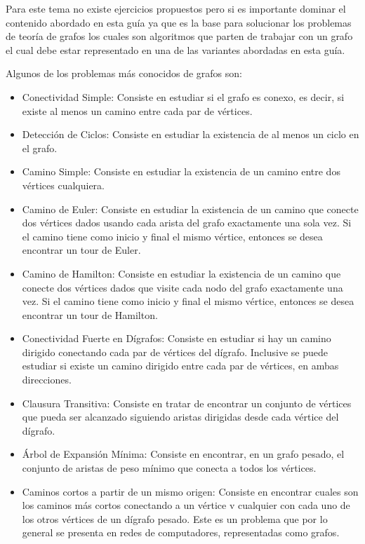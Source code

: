 Para este tema no existe ejercicios propuestos pero si es importante dominar el contenido abordado en esta guía ya que es la base para solucionar los problemas de teoría de grafos los cuales son algoritmos que parten de trabajar con un grafo el cual debe estar representado en una de las variantes abordadas en esta guía.

Algunos de los problemas más conocidos de grafos son:

\begin{itemize}
	\item Conectividad Simple: Consiste en estudiar si el grafo es conexo, es decir, si existe al menos un camino entre cada par de vértices.
	
	\item Detección de Ciclos: Consiste en estudiar la existencia de al menos un ciclo en el grafo.
	
	\item Camino Simple: Consiste en estudiar la existencia de un camino entre dos vértices cualquiera.
	
	\item Camino de Euler: Consiste en estudiar la existencia de un camino que conecte dos vértices dados usando cada arista del grafo exactamente una sola vez. Si el camino tiene como inicio y final el mismo vértice, entonces se desea encontrar un tour de Euler.
	
	\item Camino de Hamilton: Consiste en estudiar la existencia de un camino que conecte dos vértices dados que visite cada nodo del grafo exactamente una vez. Si el camino tiene como inicio y final el mismo vértice, entonces se desea encontrar un tour de Hamilton.
	
	\item Conectividad Fuerte en Dígrafos: Consiste en estudiar si hay un camino dirigido conectando cada par de vértices del dígrafo. Inclusive se puede estudiar si existe un camino dirigido entre cada par de vértices, en ambas direcciones.
	
	\item Clausura Transitiva: Consiste en tratar de encontrar un conjunto de vértices que pueda ser alcanzado siguiendo aristas dirigidas desde cada vértice del dígrafo.
	
	\item Árbol de Expansión Mínima: Consiste en encontrar, en un grafo pesado, el conjunto de aristas de peso mínimo que conecta a todos los vértices.
	
	\item Caminos cortos a partir de un mismo origen: Consiste en encontrar cuales son los caminos más cortos conectando a un vértice v cualquier con cada uno de los otros vértices de un dígrafo pesado. Este es un problema que por lo general se presenta en redes de computadores, representadas como grafos.
	

\end{itemize}
